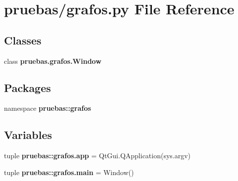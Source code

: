 \section{pruebas/grafos.py \-File \-Reference}
\label{grafos_8py}
\subsection*{\-Classes}
\begin{DoxyCompactItemize}
\item 
class {\bf pruebas.\-grafos.\-Window}
\end{DoxyCompactItemize}
\subsection*{\-Packages}
\begin{DoxyCompactItemize}
\item 
namespace {\bf pruebas\-::grafos}
\end{DoxyCompactItemize}
\subsection*{\-Variables}
\begin{DoxyCompactItemize}
\item 
tuple {\bf pruebas\-::grafos.\-app} = \-Qt\-Gui.\-Q\-Application(sys.\-argv)
\item 
tuple {\bf pruebas\-::grafos.\-main} = \-Window()
\end{DoxyCompactItemize}
